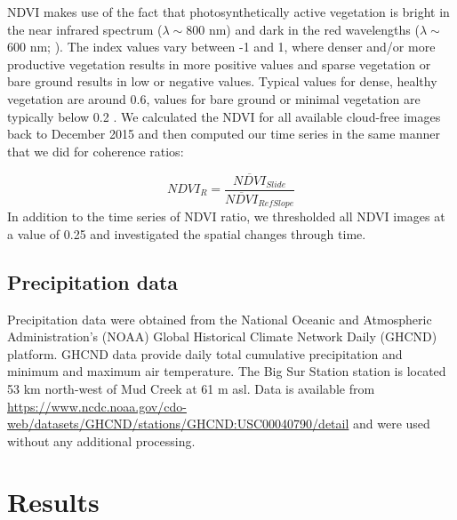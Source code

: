 \documentclass[nhess, manuscript]{copernicus}
\begin{document}
NDVI makes use of the fact that photosynthetically active vegetation is bright in the near infrared spectrum ($\lambda \sim$800 nm) and dark in the red wavelengths ($\lambda \sim$600 nm; \cite{tucker1979, carlson1997}). The index values vary between -1 and 1, where denser and/or more productive vegetation results in more positive values and sparse vegetation or bare ground results in low or negative values. Typical values for dense, healthy vegetation are around 0.6, values for bare ground or minimal vegetation are typically below 0.2 \citep{jensen2009}. We calculated the NDVI for all available cloud-free images back to December 2015 and then computed our time series in the same manner that we did for coherence ratios: \par
\begin{equation}
    NDVI_R= \frac{\overline{NDVI}_{Slide}}{\overline{NDVI}_{RefSlope}}
\end{equation}
In addition to the time series of NDVI ratio, we thresholded all NDVI images at a value of 0.25 and investigated the spatial changes through time.  
\subsection{Precipitation data}
Precipitation data were obtained from the National Oceanic and Atmospheric Administration's (NOAA) Global Historical Climate Network Daily (GHCND) platform. GHCND data provide daily total cumulative precipitation and minimum and maximum air temperature. The Big Sur Station station is located 53 km north-west of Mud Creek at 61 m asl. Data is available from \url{https://www.ncdc.noaa.gov/cdo-web/datasets/GHCND/stations/GHCND:USC00040790/detail} and were used without any additional processing. %

\section{Results}
\label{sec:results}
\end{document}
